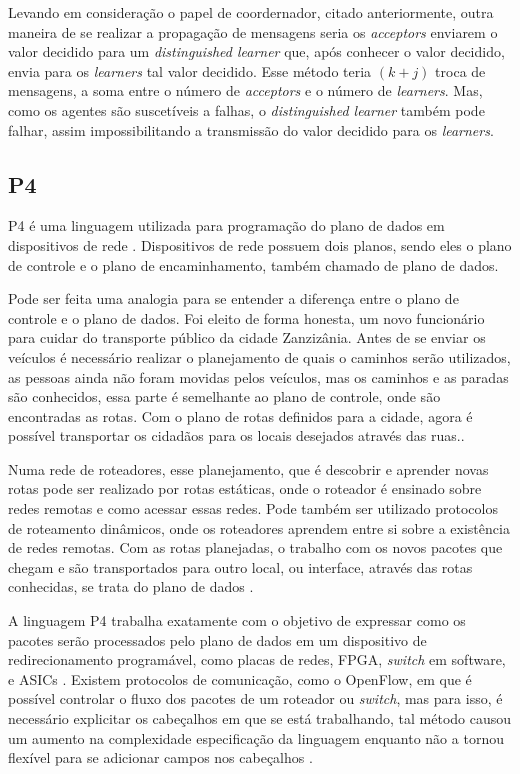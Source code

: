 \documentclass[
    12pt,
    openright, 
    oneside,
    a4paper,
    french,
    english,
    brazil
    ]{facom-ufu-abntex2}
\theoremstyle{definition}
\begin{document}
Levando em consideração o papel de coordernador, citado anteriormente, outra maneira de se 
realizar a propagação de mensagens seria os \emph{acceptors} enviarem o valor decidido para um
\emph{distinguished learner} que, após conhecer o valor decidido, envia para os
\emph{learners} tal valor decidido. Esse método teria $(k + j)$ troca de mensagens,
a soma entre o número de \emph{acceptors} e o número de \emph{learners}. Mas, como os
agentes são suscetíveis a falhas, o \emph{distinguished learner} também pode falhar,
assim impossibilitando a transmissão do valor decidido para os \emph{learners}.

\subsection{P4}
P4 é uma linguagem utilizada para programação do plano de dados em  dispositivos de 
rede \cite{paxos16spec}. Dispositivos de rede possuem dois planos, sendo eles o 
plano de controle e o plano de encaminhamento, também chamado de plano de dados. 

Pode ser feita uma analogia para se entender a diferença entre o 
plano de controle e o plano de dados. Foi eleito de forma honesta, um novo 
funcionário para cuidar do transporte público da cidade Zanzizânia. Antes de se 
enviar os veículos é necessário realizar o planejamento de quais o caminhos serão
utilizados, as pessoas ainda não foram movidas pelos veículos, mas os caminhos 
e as paradas são conhecidos, essa parte é semelhante ao plano de controle, onde 
são encontradas as rotas. Com o plano de rotas definidos para a cidade, agora é 
possível transportar os cidadãos para os locais desejados através das ruas.\cite{dataVsControl}. 

Numa rede de roteadores, esse planejamento, que é descobrir e aprender novas rotas 
pode ser realizado por rotas estáticas, onde o roteador é ensinado sobre redes remotas
e como acessar essas redes. Pode também ser utilizado protocolos de roteamento dinâmicos,
onde os roteadores aprendem entre si sobre a existência de redes remotas. Com as rotas
planejadas, o trabalho com os novos pacotes que chegam e são transportados para outro local, 
ou interface, através das rotas conhecidas, se trata do plano de dados \cite{dataVsControl}.

A linguagem P4 trabalha exatamente com o objetivo de expressar como os pacotes serão 
processados pelo plano de dados em um dispositivo de redirecionamento programável, 
como placas de redes, FPGA, \emph{switch} em software, e ASICs \cite{paxos16spec}. Existem 
protocolos de comunicação, como o OpenFlow, em que é possível controlar o fluxo dos 
pacotes de um roteador ou \emph{switch}, mas para isso, é necessário explicitar os 
cabeçalhos em que se está trabalhando, tal método causou um aumento na complexidade 
especificação da linguagem enquanto não a tornou flexível para se adicionar campos 
nos cabeçalhos \cite{bosshart2014p4}.
\end{document}
